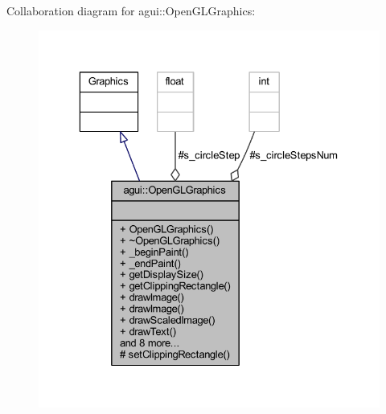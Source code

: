 Collaboration diagram for agui\+:\+:Open\+G\+L\+Graphics\+:
\nopagebreak
\begin{figure}[H]
\begin{center}
\leavevmode
\includegraphics[width=329pt]{classagui_1_1_open_g_l_graphics__coll__graph}
\end{center}
\end{figure}
